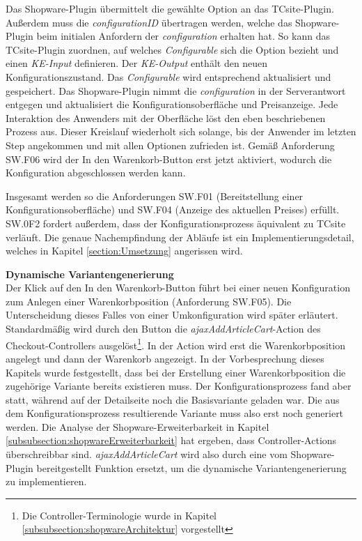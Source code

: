 \documentclass[11pt, a4paper, titlepage, listof=totoc, bibliography=totoc, index=totoc, twoside, openright, headings=normal]{scrreprt}
\begin{document}
Das Shopware-Plugin übermittelt die gewählte Option an das TCsite-Plugin. Außerdem muss die \emph{configurationID} übertragen werden, welche das Shopware-Plugin beim initialen Anfordern der \emph{configuration} erhalten hat. So kann das TCsite-Plugin zuordnen, auf welches \emph{Configurable} sich die Option bezieht und einen \emph{KE-Input} definieren. Der \emph{KE-Output} enthält den neuen Konfigurationszustand. Das \emph{Configurable} wird entsprechend aktualisiert und gespeichert. Das Shopware-Plugin nimmt die \emph{configuration} in der Serverantwort entgegen und aktualisiert die Konfigurationsoberfläche und Preisanzeige. Jede Interaktion des Anwenders mit der Oberfläche löst den eben beschriebenen Prozess aus. Dieser Kreislauf wiederholt sich solange, bis der Anwender im letzten Step angekommen und mit allen Optionen zufrieden ist. Gemäß Anforderung SW.F06 wird der \glqq In den Warenkorb\grqq{}-Button erst jetzt aktiviert, wodurch die Konfiguration abgeschlossen werden kann.

Insgesamt werden so die Anforderungen SW.F01 (Bereitstellung einer Konfigurationsoberfläche) und SW.F04 (Anzeige des aktuellen Preises) erfüllt. SW.0F2 fordert außerdem, dass der Konfigurationsprozess äquivalent zu TCsite verläuft. Die genaue Nachempfindung der Abläufe ist ein Implementierungsdetail, welches in Kapitel \ref{section:Umsetzung} angerissen wird.

\textbf{Dynamische Variantengenerierung}\\
Der Klick auf den \glqq In den Warenkorb\grqq{}-Button führt bei einer neuen Konfiguration zum Anlegen einer Warenkorbposition (Anforderung SW.F05). Die Unterscheidung dieses Falles von einer Umkonfiguration wird später erläutert.  Standardmäßig wird durch den Button die \emph{ajaxAddArticleCart}-Action des Checkout-Controllers ausgelöst\footnote{Die Controller-Terminologie wurde in Kapitel \ref{subsubsection:shopwareArchitektur} vorgestellt}. In der Action wird erst die Warenkorbposition angelegt und dann der Warenkorb angezeigt. In der Vorbesprechung dieses Kapitels wurde festgestellt, dass bei der Erstellung einer Warenkorbposition die zugehörige Variante bereits existieren muss. Der Konfigurationsprozess fand aber statt, während auf der Detailseite noch die Basisvariante geladen war. Die aus dem Konfigurationsprozess resultierende Variante muss also erst noch generiert werden. Die Analyse der Shopware-Erweiterbarkeit in Kapitel \ref{subsubsection:shopwareErweiterbarkeit} hat ergeben, dass Controller-Actions überschreibbar sind. \emph{ajaxAddArticleCart} wird also durch eine vom Shopware-Plugin bereitgestellt Funktion ersetzt, um die dynamische Variantengenerierung zu implementieren.
\end{document}
